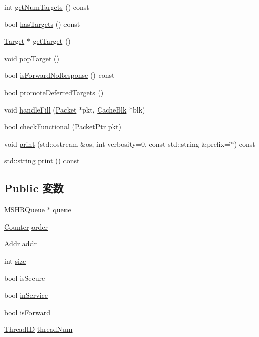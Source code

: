 \begin{DoxyCompactItemize}
\item 
int \hyperlink{classMSHR_ab22af10809b116b3a7ecba267c795c8a}{getNumTargets} () const 
\item 
bool \hyperlink{classMSHR_a9b007d67bfb5a6ff382a6d78ec08b3af}{hasTargets} () const 
\item 
\hyperlink{classMSHR_1_1Target}{Target} $\ast$ \hyperlink{classMSHR_ae068bab5bed8991efdfcd7829d9ca5e3}{getTarget} ()
\item 
void \hyperlink{classMSHR_a660e7beed1d7d25852a9bc63d1f314b3}{popTarget} ()
\item 
bool \hyperlink{classMSHR_aee2f7196808cfdd31122d93d11b633de}{isForwardNoResponse} () const 
\item 
bool \hyperlink{classMSHR_a6b0d016d76a2a7570d1d51eaa3086845}{promoteDeferredTargets} ()
\item 
void \hyperlink{classMSHR_aff2dbaf9542ae841979f44a7af2fab0b}{handleFill} (\hyperlink{classPacket}{Packet} $\ast$pkt, \hyperlink{classCacheBlk}{CacheBlk} $\ast$blk)
\item 
bool \hyperlink{classMSHR_a8eb60d4744b6212ad749f3a586759266}{checkFunctional} (\hyperlink{classPacket}{PacketPtr} pkt)
\item 
void \hyperlink{classMSHR_ad5a464e147506af89ea2778d731fe46f}{print} (std::ostream \&os, int verbosity=0, const std::string \&prefix=\char`\"{}\char`\"{}) const 
\item 
std::string \hyperlink{classMSHR_ae8a5b5e9e0e6be3b115ee77fa7b4d0c8}{print} () const 
\end{DoxyCompactItemize}
\subsection*{Public 変数}
\begin{DoxyCompactItemize}
\item 
\hyperlink{classMSHRQueue}{MSHRQueue} $\ast$ \hyperlink{classMSHR_a524ec1b0c7b11e23904171e42211679e}{queue}
\item 
\hyperlink{base_2types_8hh_ae1475755791765b8e6f6a8bb091e273e}{Counter} \hyperlink{classMSHR_a268baba59d9078c070be7059fd90d9bc}{order}
\item 
\hyperlink{base_2types_8hh_af1bb03d6a4ee096394a6749f0a169232}{Addr} \hyperlink{classMSHR_a0bb77b4ba61e408313e1118250f9278c}{addr}
\item 
int \hyperlink{classMSHR_a439227feff9d7f55384e8780cfc2eb82}{size}
\item 
bool \hyperlink{classMSHR_a62bc84f4251f16cf0cfa0f8d96e00c37}{isSecure}
\item 
bool \hyperlink{classMSHR_a7f5c4fb6e9162689992ccd0cd7bce17b}{inService}
\item 
bool \hyperlink{classMSHR_a9b36b981f171b10bc35fbd5f79c3bae1}{isForward}
\item 
\hyperlink{base_2types_8hh_ab39b1a4f9dad884694c7a74ed69e6a6b}{ThreadID} \hyperlink{classMSHR_a7ec985ceacc8f2c379dbccca0b2e0f44}{threadNum}
\end{DoxyCompactItemize}
